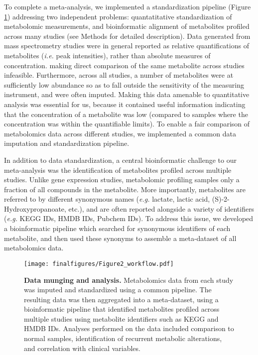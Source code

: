 \documentclass[10pt]{article}
\begin{document}
To complete a meta-analysis, we implemented a standardization pipeline (Figure \ref{fig:Fig2}) addressing two independent problems: quantatitative standardization of metabolomic measurements, and bioinformatic alignment of metabolites profiled across many studies (see Methods for detailed description). Data generated from mass spectrometry studies were in general reported as relative quantifications of metabolites (\textit{i.e.} peak intensities), rather than absolute measures of concentration. making direct comparison of the same metabolite across studies infeasible. Furthermore, across all studies, a number of metabolites were at sufficiently low abundance so as to fall outside the sensitivity of the measuring instrument, and were often imputed. Making this data amenable to quantitative analysis was essential for us, because it contained useful information indicating that the concentration of a metabolite was low (compared to samples where the concentration was within the quantifiable limits). To enable a fair comparison of metabolomics data across different studies, we implemented a common data imputation and standardization pipeline.

In addition to data standardization, a central bioinformatic challenge to our meta-analysis was the identification of metabolites profiled across multiple studies. Unlike gene expression studies, metabolomic profiling samples only a fraction of all compounds in the metabolite. More importantly,  metabolites are referred to by different synonymous names (\textit{e.g.} lactate, lactic acid, (S)-2-Hydroxypropanoate, etc.), and are often reported alongside a variety of identifiers (\textit{e.g.} KEGG IDs, HMDB IDs, Pubchem IDs). To address this issue, we developed a bioinformatic pipeline which searched for synonymous identifiers of each metabolite, and then used these synonyms to assemble a meta-dataset of all metabolomics data.

\begin{figure}[ht!]
  \centering
     \texttt{[image: finalfigures/Figure2\_workflow.pdf]}
  \caption{\textbf{Data munging and analysis.} Metabolomics data from each study was imputed and standardized using a common pipeline. The resulting data was then aggregated into a meta-dataset, using a bioinformatic pipeline that identified metabolites profiled across multiple studies using metabolite identifiers such as KEGG and HMDB IDs. Analyses performed on the data included comparison to normal samples, identification of recurrent metabolic alterations, and correlation with clinical variables.}
     \label{fig:Fig2}
\end{figure}
\end{document}
